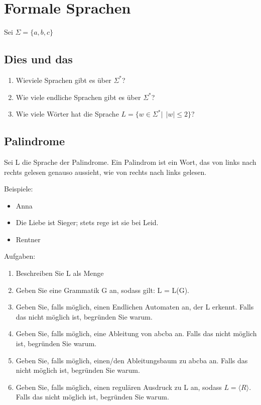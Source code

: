 \documentclass[a4paper,12pt]{article}
\begin{document}
\pagebreak

\section{Formale Sprachen}
Sei $\Sigma = \{a, b, c\}$

\subsection{Dies und das}
\begin{enumerate}
  \item Wieviele Sprachen gibt es über $\Sigma^*$?
  \item Wie viele endliche Sprachen gibt es über $\Sigma^*$?
  \item Wie viele Wörter hat die Sprache $L = \{w \in \Sigma^* |~~|w| \leq 2\}$?
\end{enumerate}

\subsection{Palindrome}
Sei L die Sprache der Palindrome. Ein Palindrom ist ein Wort, das von links nach
rechts gelesen genauso aussieht, wie von rechts nach links gelesen.

Beispiele:
\begin{itemize}
  \item Anna
  \item Die Liebe ist Sieger; stets rege ist sie bei Leid.
  \item Rentner
\end{itemize}

Aufgaben:
\begin{enumerate}
  \item Beschreiben Sie L als Menge
  \item Geben Sie eine Grammatik G an, sodass gilt: L = L(G).
  \item Geben Sie, falls möglich, einen Endlichen Automaten an, der L erkennt. Falls das nicht möglich ist, begründen Sie warum.
  \item Geben Sie, falls möglich, eine Ableitung von \glqq abcba\grqq{} an. Falls das nicht möglich ist, begründen Sie warum.
  \item Geben Sie, falls möglich, einen/den Ableitungsbaum zu \glqq abcba\grqq{} an. Falls das nicht möglich ist, begründen Sie warum.
  \item Geben Sie, falls möglich, einen regulären Ausdruck zu L an, sodass $L = \langle R \rangle $. Falls das nicht möglich ist, begründen Sie warum.
\end{enumerate}
\end{document}
